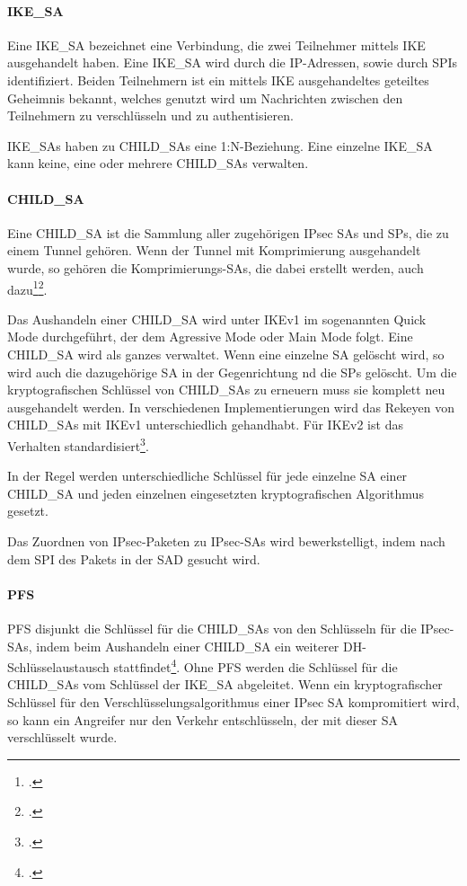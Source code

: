 \paragraph{IKE\_SA}
Eine IKE\_SA bezeichnet eine Verbindung, die zwei Teilnehmer mittels IKE ausgehandelt haben.
Eine IKE\_SA wird durch die \ac{IP}-Adressen, sowie durch \acp{SPI} identifiziert.
Beiden Teilnehmern ist ein mittels \ac{IKE} ausgehandeltes geteiltes Geheimnis bekannt,
welches genutzt wird um Nachrichten zwischen den Teilnehmern zu verschlüsseln und zu authentisieren.

IKE\_SAs haben zu CHILD\_SAs eine 1:N-Beziehung. Eine einzelne IKE\_SA kann keine, eine
oder mehrere CHILD\_SAs verwalten.

\paragraph{CHILD\_SA}
Eine CHILD\_SA ist die Sammlung aller zugehörigen \ac{IPsec} \acp{SA} und \acp{SP},
die zu einem Tunnel gehören. Wenn der Tunnel mit Komprimierung ausgehandelt wurde,
so gehören die Komprimierungs-\acp{SA}, die dabei erstellt werden, auch dazu\footcite[][7]{abraham_shacham_rfc_2001}\footcite[][61]{charlie_kaufman_rfc_2014}.

Das Aushandeln einer CHILD\_SA wird unter IKEv1 im sogenannten Quick Mode durchgeführt, der dem Agressive Mode
oder Main Mode folgt.
Eine CHILD\_SA wird als ganzes verwaltet. Wenn eine einzelne \ac{SA} gelöscht wird, so wird
auch die dazugehörige \ac{SA} in der Gegenrichtung nd die \acp{SP} gelöscht.
Um die kryptografischen Schlüssel von CHILD\_SAs zu erneuern muss sie komplett neu ausgehandelt werden.
In verschiedenen Implementierungen wird das Rekeyen von CHILD\_SAs mit IKEv1 unterschiedlich gehandhabt.
Für IKEv2 ist das Verhalten standardisiert\footcite[][16]{charlie_kaufman_rfc_2014}.

In der Regel werden unterschiedliche Schlüssel für jede einzelne SA einer CHILD\_SA
und jeden einzelnen eingesetzten kryptografischen Algorithmus gesetzt.

Das Zuordnen von \ac{IPsec}-Paketen zu \ac{IPsec}-\acp{SA} wird bewerkstelligt,
indem nach dem \ac{SPI} des Pakets in der \ac{SAD} gesucht wird.


\paragraph{PFS}
\ac{PFS} disjunkt die Schlüssel für die CHILD\_SAs von den Schlüsseln
für die \ac{IPsec}-\acp{SA}, indem beim Aushandeln einer CHILD\_SA ein weiterer
\ac{DH}-Schlüsselaustausch stattfindet\footcite[13]{charlie_kaufman_rfc_2014}.
Ohne \ac{PFS} werden die Schlüssel für die CHILD\_SAs vom Schlüssel der IKE\_SA
abgeleitet. Wenn ein kryptografischer Schlüssel für den Verschlüsselungsalgorithmus
einer \ac{IPsec} \ac{SA} kompromitiert wird, so kann ein Angreifer nur den Verkehr entschlüsseln,
der mit dieser \ac{SA} verschlüsselt wurde.

